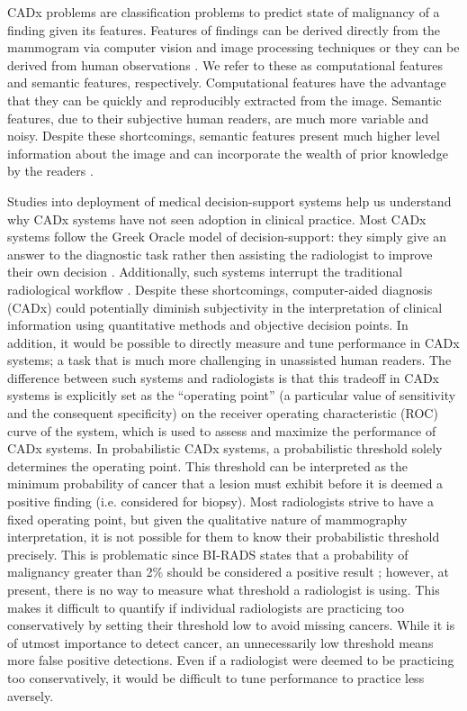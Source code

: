 CADx problems are classification problems to predict state of malignancy of a finding given its features. Features of findings can be derived directly from the mammogram via computer vision and image processing techniques \cite{Jiang:1999fj,Jiang:2001fy, Giger:2013jb, Eadie:2011cv} or they can be derived from human observations \cite{ElizabethS:2005gc, Burnside:2000wl, Rubin:2005jg}. We refer to these as computational features and semantic features, respectively. Computational features have the advantage that they can be quickly and reproducibly extracted from the image. Semantic features, due to their subjective human readers, are much more variable and noisy. Despite these shortcomings, semantic features present much higher level information about the image and can incorporate the wealth of prior knowledge by the readers \cite{Liberman:ws,Elter:2009fv}.

Studies into deployment of medical decision-support systems help us understand why CADx systems have not seen adoption in clinical practice. Most CADx systems follow the Greek Oracle model of decision-support: they simply give an answer to the diagnostic task rather then assisting the radiologist to improve their own decision \cite{Miller:1990wg, Friedman:2009dx, Bright:2012ga}. Additionally, such systems interrupt the traditional radiological workflow \cite{Morgan:2011ct}. Despite these shortcomings, computer-aided diagnosis (CADx) could potentially diminish subjectivity in the interpretation of clinical information using quantitative methods and objective decision points. In addition, it would be possible to directly measure and tune performance in CADx systems; a task that is much more challenging in unassisted human readers. The difference between such systems and radiologists is that this tradeoff in CADx systems is explicitly set as the “operating point” (a particular value of sensitivity and the consequent specificity) on the receiver operating characteristic (ROC) curve of the system, which is used to assess and maximize the performance of CADx systems. In probabilistic CADx systems, a probabilistic threshold solely determines the operating point. This threshold can be interpreted as the minimum probability of cancer that a lesion must exhibit before it is deemed a positive finding (i.e. considered for biopsy). Most radiologists strive to have a fixed operating point, but given the qualitative nature of mammography interpretation, it is not possible for them to know their probabilistic threshold precisely. This is problematic since BI-RADS states that a probability of malignancy greater than 2\% should be considered a positive result \cite{Liberman:ws,Liberman:2002gg}; however, at present, there is no way to measure what threshold a radiologist is using. This makes it difficult to quantify if individual radiologists are practicing too conservatively by setting their threshold low to avoid missing cancers. While it is of utmost importance to detect cancer, an unnecessarily low threshold means more false positive detections. Even if a radiologist were deemed to be practicing too conservatively, it would be difficult to tune performance to practice less aversely.








